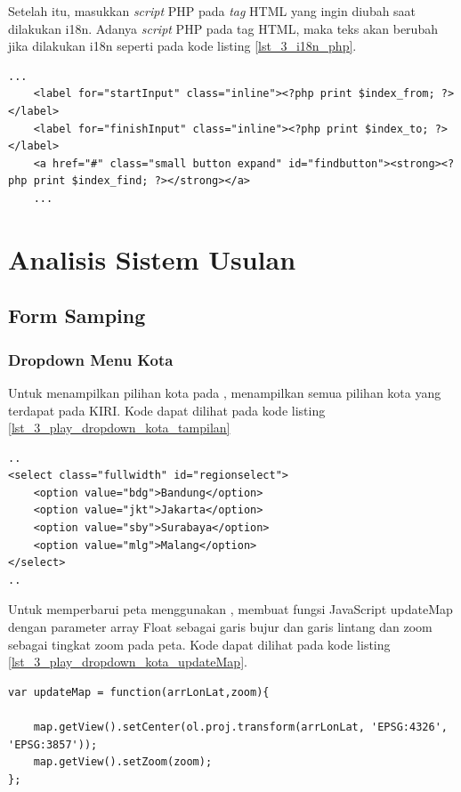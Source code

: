 Setelah itu, masukkan \textit{script} PHP pada \textit{tag} HTML yang ingin diubah saat dilakukan i18n. Adanya \textit{script} PHP pada tag HTML, maka teks akan berubah jika dilakukan i18n seperti pada kode listing \ref{lst_3_i18n_php}.

\begin{lstlisting}[caption=Script PHP untuk Internationalization,label = {lst_3_i18n_php}]
	...
	<label for="startInput" class="inline"><?php print $index_from; ?></label>
	<label for="finishInput" class="inline"><?php print $index_to; ?></label>
	<a href="#" class="small button expand" id="findbutton"><strong><?php print $index_find; ?></strong></a>
	...
\end{lstlisting}

\section{Analisis Sistem Usulan}
\label{sec:perubahan}

\subsection{Form Samping}
\subsubsection{Dropdown Menu Kota}
Untuk menampilkan pilihan kota pada \play, menampilkan semua pilihan kota yang terdapat pada KIRI. Kode dapat dilihat pada kode listing \ref{lst_3_play_dropdown_kota_tampilan}

\begin{lstlisting}[caption=Menampilkan pilihan kota kepada pengguna ,label = {lst_3_play_dropdown_kota_tampilan}]
..
<select class="fullwidth" id="regionselect">
    <option value="bdg">Bandung</option>
    <option value="jkt">Jakarta</option>
    <option value="sby">Surabaya</option>
    <option value="mlg">Malang</option>
</select>
..
\end{lstlisting}

Untuk memperbarui peta menggunakan \play, membuat fungsi JavaScript updateMap dengan parameter array Float sebagai garis bujur dan garis lintang dan zoom sebagai tingkat zoom pada peta. Kode dapat dilihat pada kode listing \ref{lst_3_play_dropdown_kota_updateMap}.

\begin{lstlisting}[caption=Fungsi JavaScript untuk memperbarui peta ,label = {lst_3_play_dropdown_kota_updateMap}]
var updateMap = function(arrLonLat,zoom){

    map.getView().setCenter(ol.proj.transform(arrLonLat, 'EPSG:4326', 'EPSG:3857'));
    map.getView().setZoom(zoom);
};
\end{lstlisting}

